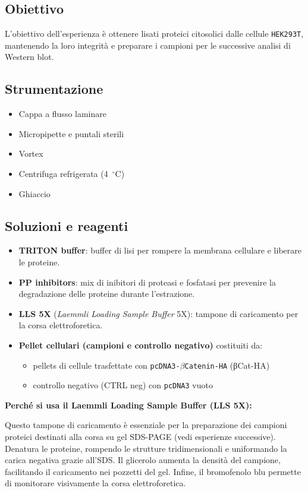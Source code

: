 \subsection{Obiettivo}
L’obiettivo dell’esperienza è ottenere lisati proteici citosolici dalle cellule \texttt{HEK293T}, mantenendo la loro integrità e preparare i campioni per le successive analisi di Western blot.

\subsection{Strumentazione}\footnotesize
\begin{itemize}
	\item Cappa a flusso laminare
	\item Micropipette e puntali sterili
	\item Vortex
	\item Centrifuga refrigerata (4~$^\circ$C)
	\item Ghiaccio
\end{itemize}

\subsection{Soluzioni e reagenti}\footnotesize{
  \begin{itemize}
	\item \textbf{TRITON buffer}: buffer di lisi per rompere la membrana cellulare e liberare le proteine.
	\item \textbf{PP inhibitors}: mix di inibitori di proteasi e fosfatasi per prevenire la degradazione delle proteine durante l’estrazione.
	\item \textbf{LLS 5X} (\textit{Laemmli Loading Sample Buffer} 5X): tampone di caricamento per la corsa elettroforetica.
	\item \textbf{Pellet cellulari (campioni e controllo negativo)} costituiti da:
	\begin{itemize}\footnotesize
		\item pellets di cellule trasfettate con \texttt{pcDNA3-$\beta$Catenin-HA} (βCat-HA)
		\item controllo negativo (CTRL neg) con \texttt{pcDNA3} vuoto
	\end{itemize}

\end{itemize}
}

\vspace{1em}
\begin{percheBox}
	\textbf{Perché si usa il Laemmli Loading Sample Buffer (LLS 5X):}

	Questo tampone di caricamento è essenziale per la preparazione dei campioni proteici destinati alla corsa su gel SDS-PAGE (vedi esperienze successive).
	Denatura le proteine, rompendo le strutture tridimensionali e uniformando la carica negativa grazie all’SDS.
	Il glicerolo aumenta la densità del campione, facilitando il caricamento nei pozzetti del gel.
	Infine, il bromofenolo blu permette di monitorare visivamente la corsa elettroforetica.
\end{percheBox}
\newpage

